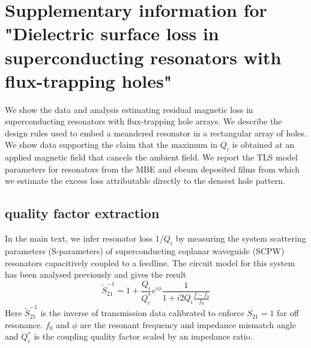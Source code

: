 
\chapter[Supplementary information for "Dielectric surface loss in superconducting resonators with flux-trapping holes"]{Supplementary information for "Dielectric surface loss in superconducting resonators with flux-trapping holes"}
\label{ch:Vortex-supp}


\def \Bcapp {\text{B}^{\text{cool}}_{\text{applied}}}

We show the data and analysis estimating residual magnetic loss in superconducting resonators with flux-trapping hole arrays. We describe the design rules used to embed a meandered resonator in a rectangular array of holes.  We show data supporting the claim that the maximum in $Q_{i}$ is obtained at an applied magnetic field that cancels the ambient field.  We report the TLS model parameters for resonators from the MBE and ebeam deposited films from which we estimate the excess loss attributable directly to the densest hole pattern.
\section{quality factor extraction}
In the main text, we infer resonator loss 1/$Q_i$ by measuring the system scattering parameters (S-parameters) of superconducting coplanar waveguide (SCPW) resonators capacitively coupled to a feedline.  The circuit model for this system has been analysed previously \cite{megrant2012} and gives the result
\begin{equation}
    \label{spectroscopyS21}
    \tilde{S}_{21}^{-1} = 1 + \frac{Q_{i}}{Q_{c}^{*}}e^{i \phi}\frac{1}{1+i2 Q_{i} \frac{f-f_{0}}{f_{0}}}
\end{equation}
Here $\tilde{S}_{21}^{-1}$ is the inverse of transmission data calibrated to enforce $S_{21}=1$ far off resonance.  $f_{0}$ and $\phi$ are the resonant frequency and impedance mismatch angle and  $Q_{c}^{*}$ is the coupling quality factor scaled by an impedance ratio.

